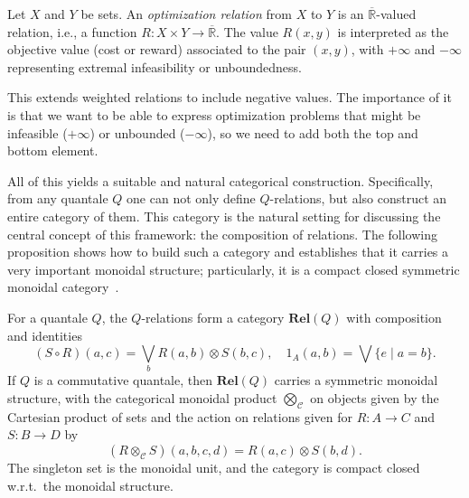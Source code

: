 \begin{definition}
	Let $X$ and $Y$ be sets.
	An \emph{optimization relation} from $X$ to $Y$ is an
	$\overline{\mathbb{R}}$-valued relation, i.e., a function
	$R : X \times Y \to \overline{\mathbb{R}}$.
	The value $R(x,y)$ is interpreted as the objective value
	(cost or reward) associated to the pair $(x,y)$,
	with $+\infty$ and $-\infty$ representing extremal infeasibility
	or unboundedness.
\end{definition}

This extends weighted relations to include negative values. The importance of it is that we want
to be able to express optimization problems that might be infeasible
($+\infty$) or unbounded ($-\infty$), so we need to add both
the top and bottom element.

All of this yields a suitable and natural categorical construction.
Specifically, from any quantale $Q$ one can not only define $Q$-relations,
but also construct an entire category of them.
This category is the natural setting for discussing the
central concept of this framework: the composition of relations.
The following proposition shows how to build such a category and establishes
that it carries a very important monoidal structure;
particularly, it is a compact closed
symmetric monoidal category~\cite{maclane1998categories}.

\begin{proposition}
	For a quantale $Q$, the $Q$-relations form a category $\mathbf{Rel}(Q)$ with composition and identities
	\[
		(S\circ R) (a,c) = \bigvee_b R(a,b) \otimes S(b,c), \quad 1_A(a,b) = \bigvee \{e \mid a=b\}.
	\]
	If $Q$ is a commutative quantale, then $\mathbf{Rel}(Q)$ carries a symmetric monoidal structure, with the categorical monoidal product $\bigotimes_{\mathcal{C}}$ on objects given by the Cartesian product of sets and the action on relations given for $R:A \to C$ and $S:B\to D$ by
	\[
		(R\otimes_{\mathcal{C}} S)(a,b,c,d) = R(a,c) \otimes S(b,d).
	\]
	The singleton set is the monoidal unit, and the category is compact closed w.r.t.\ the monoidal structure.
\end{proposition}

